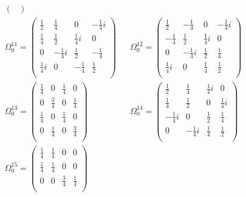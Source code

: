 \begin{align*}
\begin{pmatrix}
    \end{pmatrix}
    \\
    \Omega_{0}^{11} = 
    \begin{pmatrix}
    \frac{1}{2}  &  \frac{1}{4}  &  0  &  -\frac{1}{4}i  \\
    \frac{1}{4}  &  \frac{1}{2}  &  \frac{1}{4}i  &  0  \\
    0  &  -\frac{1}{4}i  &  \frac{1}{2}  &  -\frac{1}{4}  \\
    \frac{1}{4}i  &  0  &  -\frac{1}{4}  &  \frac{1}{2}  \\
    \end{pmatrix}
    &&
    \Omega_{0}^{12} = 
    \begin{pmatrix}
    \frac{1}{2}  &  -\frac{1}{4}  &  0  &  -\frac{1}{4}i  \\
    -\frac{1}{4}  &  \frac{1}{2}  &  \frac{1}{4}i  &  0  \\
    0  &  -\frac{1}{4}i  &  \frac{1}{2}  &  \frac{1}{4}  \\
    \frac{1}{4}i  &  0  &  \frac{1}{4}  &  \frac{1}{2}  \\
    \end{pmatrix}
    \\
    \Omega_{0}^{13} = 
    \begin{pmatrix}
    \frac{1}{4}  &  0  &  \frac{1}{4}  &  0  \\
    0  &  \frac{3}{4}  &  0  &  \frac{1}{4}  \\
    \frac{1}{4}  &  0  &  \frac{1}{4}  &  0  \\
    0  &  \frac{1}{4}  &  0  &  \frac{3}{4}  \\
    \end{pmatrix}
    &&
    \Omega_{0}^{14} = 
    \begin{pmatrix}
    \frac{1}{2}  &  \frac{1}{4}  &  \frac{1}{4}i  &  0  \\
    \frac{1}{4}  &  \frac{1}{2}  &  0  &  \frac{1}{4}i  \\
    -\frac{1}{4}i  &  0  &  \frac{1}{2}  &  \frac{1}{4}  \\
    0  &  -\frac{1}{4}i  &  \frac{1}{4}  &  \frac{1}{2}  \\
    \end{pmatrix}
    \\
    \Omega_{0}^{15} = 
    \begin{pmatrix}
    \frac{1}{4}  &  \frac{1}{4}  &  0  &  0  \\
    \frac{1}{4}  &  \frac{1}{4}  &  0  &  0  \\
    0  &  0  &  \frac{3}{4}  &  \frac{1}{4}  \\

\end{pmatrix}
\end{align*}
